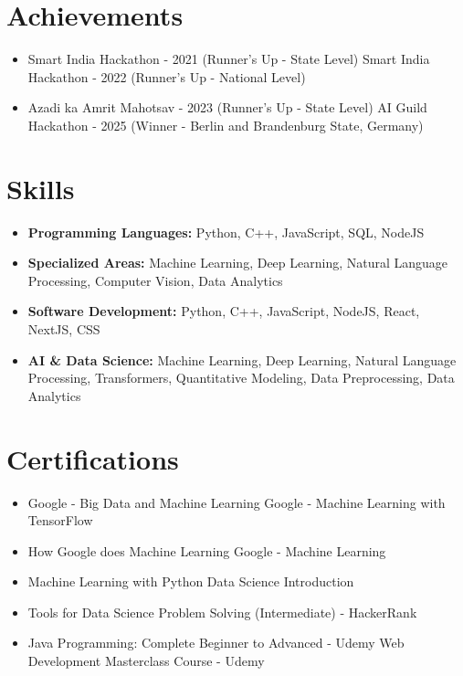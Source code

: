 \documentclass[a4paper,10pt]{article}
\begin{document}
\section*{Achievements}
\begin{itemize}
\item Smart India Hackathon - 2021 (Runner's Up - State Level) \hfill Smart India Hackathon - 2022 (Runner's Up - National Level)
\item Azadi ka Amrit Mahotsav - 2023 (Runner's Up - State Level) \hfill AI Guild Hackathon - 2025 (Winner - Berlin and Brandenburg State, Germany)
\end{itemize}

\section*{Skills}
\begin{itemize}
  \item \textbf{Programming Languages:} Python, C++, JavaScript, SQL, NodeJS
  \item \textbf{Specialized Areas:} Machine Learning, Deep Learning, Natural Language Processing, Computer Vision, Data Analytics
  \item \textbf{Software Development:} Python, C++, JavaScript, NodeJS, React, NextJS, CSS
  \item \textbf{AI \& Data Science:} Machine Learning, Deep Learning, Natural Language Processing, Transformers, Quantitative Modeling, Data Preprocessing, Data Analytics
\end{itemize}

\section*{Certifications}
\begin{itemize}
\item Google - Big Data and Machine Learning \hfill Google - Machine Learning with TensorFlow
\item How Google does Machine Learning \hfill Google - Machine Learning
\item Machine Learning with Python \hfill Data Science Introduction
\item Tools for Data Science \hfill Problem Solving (Intermediate) - HackerRank
\item Java Programming: Complete Beginner to Advanced - Udemy \hfill Web Development Masterclass Course - Udemy
\end{itemize}
\end{document}
